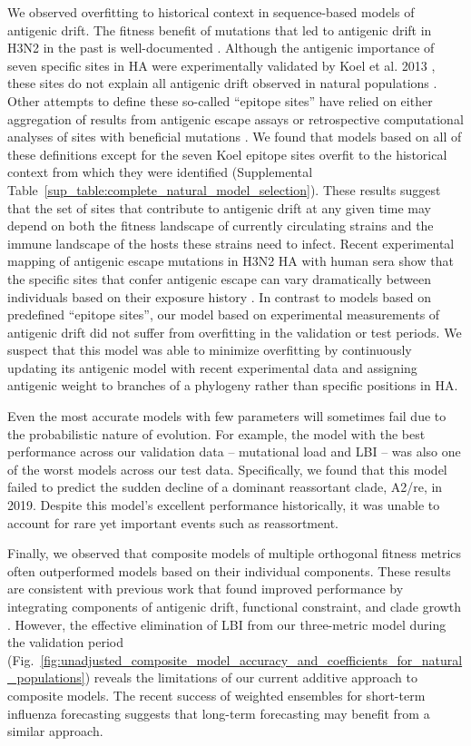 We observed overfitting to historical context in sequence-based models of antigenic drift.
The fitness benefit of mutations that led to antigenic drift in H3N2 in the past is well-documented \cite{Wiley:1981bc,Smith:2004jc,Wolf:2006da,Koel:2013jz}.
Although the antigenic importance of seven specific sites in HA were experimentally validated by Koel et al. 2013 \cite{Koel:2013jz}, these sites do not explain all antigenic drift observed in natural populations \cite{Neher:2016hy}.
Other attempts to define these so-called ``epitope sites'' have relied on either aggregation of results from antigenic escape assays \cite{Wolf:2006da} or retrospective computational analyses of sites with beneficial mutations \cite{Shih:2007bd,Luksza:2014hj}.
We found that models based on all of these definitions except for the seven Koel epitope sites overfit to the historical context from which they were identified (Supplemental Table~\ref{sup_table:complete_natural_model_selection}).
These results suggest that the set of sites that contribute to antigenic drift at any given time may depend on both the fitness landscape of currently circulating strains and the immune landscape of the hosts these strains need to infect.
Recent experimental mapping of antigenic escape mutations in H3N2 HA with human sera show that the specific sites that confer antigenic escape can vary dramatically between individuals based on their exposure history \cite{Lee2019}.
In contrast to models based on predefined ``epitope sites'', our model based on experimental measurements of antigenic drift did not suffer from overfitting in the validation or test periods.
We suspect that this model was able to minimize overfitting by continuously updating its antigenic model with recent experimental data and assigning antigenic weight to branches of a phylogeny rather than specific positions in HA.

Even the most accurate models with few parameters will sometimes fail due to the probabilistic nature of evolution.
For example, the model with the best performance across our validation data -- mutational load and LBI -- was also one of the worst models across our test data.
Specifically, we found that this model failed to predict the sudden decline of a dominant reassortant clade, A2/re, in 2019.
Despite this model's excellent performance historically, it was unable to account for rare yet important events such as reassortment.

Finally, we observed that composite models of multiple orthogonal fitness metrics often outperformed models based on their individual components.
These results are consistent with previous work that found improved performance by integrating components of antigenic drift, functional constraint, and clade growth \cite{Luksza:2014hj}.
However, the effective elimination of LBI from our three-metric model during the validation period (Fig.~\ref{fig:unadjusted_composite_model_accuracy_and_coefficients_for_natural_populations}) reveals the limitations of our current additive approach to composite models.
The recent success of weighted ensembles for short-term influenza forecasting \cite{Reich:2019bq} suggests that long-term forecasting may benefit from a similar approach.

